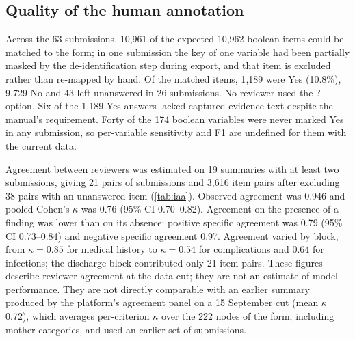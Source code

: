 \subsection{Quality of the human annotation}\label{sec:res-annotation}

Across the 63 submissions, 10{,}961 of the expected 10{,}962 boolean items could be matched to the form; in one
submission the key of one variable had been partially masked by the de-identification step during export, and that
item is excluded rather than re-mapped by hand. Of the matched items, 1{,}189 were Yes (10.8\%), 9{,}729 No and 43
left unanswered in 26 submissions. No reviewer used the ? option. Six of the 1{,}189 Yes answers lacked
captured evidence text despite the manual's requirement. Forty of the 174 boolean variables were never
marked Yes in any submission, so per-variable sensitivity and F1 are undefined for them with the current
data.

Agreement between reviewers was estimated on 19 summaries with at least two submissions, giving 21 pairs of
submissions and 3{,}616 item pairs after excluding 38 pairs with an unanswered item (\cref{tab:iaa}). Observed
agreement was 0.946 and pooled Cohen's $\kappa$ was 0.76 (95\% CI 0.70--0.82). Agreement on the presence of
a finding was lower than on its absence: positive specific agreement was 0.79 (95\% CI 0.73--0.84) and
negative specific agreement 0.97. Agreement varied by block, from $\kappa = 0.85$ for medical history to
$\kappa = 0.54$ for complications and $0.64$ for infections; the discharge block contributed only 21 item pairs.
These figures describe reviewer agreement at the data cut; they are not an estimate of model performance.
They are not directly comparable with an earlier summary produced by the platform's agreement panel on a
15 September cut (mean $\kappa$ 0.72), which averages per-criterion $\kappa$ over the 222 nodes of the form, including
mother categories, and used an earlier set of submissions.


